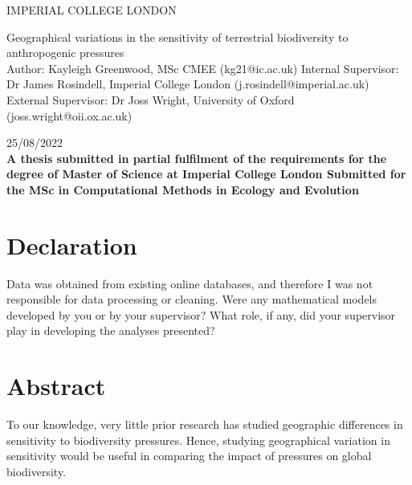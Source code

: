 \documentclass[11pt, a4paper, titlepage]{article}
\begin{document}
    \begin{titlepage}
    \begin{center}
            {\large IMPERIAL COLLEGE LONDON}
    \end{center}
    
    \vspace*{\fill}
    
    \begin{center}
        {\Huge 
    	 Geographical variations in the sensitivity of terrestrial biodiversity to anthropogenic pressures}
        \\[2in]
        Author: Kayleigh Greenwood, MSc CMEE (kg21@ic.ac.uk)
        \bigskip
        \newline
       Internal Supervisor: Dr James Rosindell, Imperial College London (j.rosindell@imperial.ac.uk)
       \bigskip
       \newline
        External Supervisor: Dr Joss Wright, University of Oxford (joss.wright@oii.ox.ac.uk)
        \bigskip
        \newline

        25/08/2022
        \\[2in]
        
        {\bfseries A thesis submitted in partial fulfilment of the requirements for the degree of Master of Science at Imperial College London \newline \newline Submitted for the MSc in Computational Methods in Ecology and Evolution }

        

    
	\end{center}
    \vspace{\fill}
    
    \end{titlepage}
	\section*{Declaration}
	\begin{center}
	Data was obtained from existing online databases, and therefore I was not responsible for data processing or cleaning. \newline
	Were any mathematical models developed by you or by your supervisor? \newline
	What role, if any, did your supervisor play in developing the analyses presented?
	\end{center}
	\newpage
	
	\section*{Abstract}
	\newpage
	 To our knowledge, very little prior research has studied geographic differences in sensitivity to biodiversity pressures. Hence, studying geographical variation in  sensitivity would be useful in comparing the impact of pressures on global biodiversity.
	 
\end{document}
